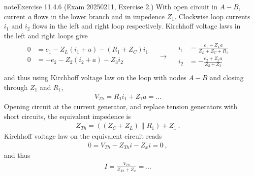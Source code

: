 \documentclass[letterpaper,10pt,english]{jupyterBook}
\begin{document}
\begin{sphinxadmonition}{note}{Exercise 11.4.6 (Exam 2025\sphinxhyphen{}02\sphinxhyphen{}11, Exercise 2.)}
\sphinxAtStartPar
{} With open circuit in \(A-B\), current \(a\) flows in the lower branch and in impedence \(Z_1\). Clockwise loop currents \(i_1\) and \(i_2\) flows in the left and right loop respectively. Kirchhoff voltage laws in the left and right loops give
\begin{equation*}
\begin{split}\begin{aligned}
  0 & = e_1 - Z_L (i_1 + a) - (R_1 + Z_C) i_1 \\
  0 & = -e_2 - Z_2 (i_2 + a) - Z_3 i_2 \\
\end{aligned}
\quad \rightarrow \quad
\begin{aligned}
  i_1 & = \frac{e_1 - Z_L a}{Z_L + Z_C + R_1} \\
  i_2 & = -\frac{e_2 + Z_2 a}{Z_2 + Z_3} \\
\end{aligned}\end{split}
\end{equation*}
\sphinxAtStartPar
and thus using Kirchhoff voltage law on the loop with nodes \(A-B\) and closing through \(Z_1\) and \(R_1\),
\begin{equation*}
\begin{split}V_{Th} = R_1 i_1 + Z_1 a = \dots\end{split}
\end{equation*}
\sphinxAtStartPar
{} Opening circuit at the current generator, and replace tension generators with short circuits, the equivalent impedence is
\begin{equation*}
\begin{split}Z_{Th} = ( (Z_C + Z_L) \parallel R_1) + Z_1 \ .\end{split}
\end{equation*}
\sphinxAtStartPar
{} Kirchhoff voltage law on the equivalent circuit reads
\begin{equation*}
\begin{split}0 = V_{Th} - Z_{Th} i - Z_{x} i = 0 \ ,\end{split}
\end{equation*}
\sphinxAtStartPar
and thus
\begin{equation*}
\begin{split}I = \frac{V_{Th}}{Z_{Th} + Z_{x}} = \dots\end{split}
\end{equation*}

\end{sphinxadmonition}
\end{document}
